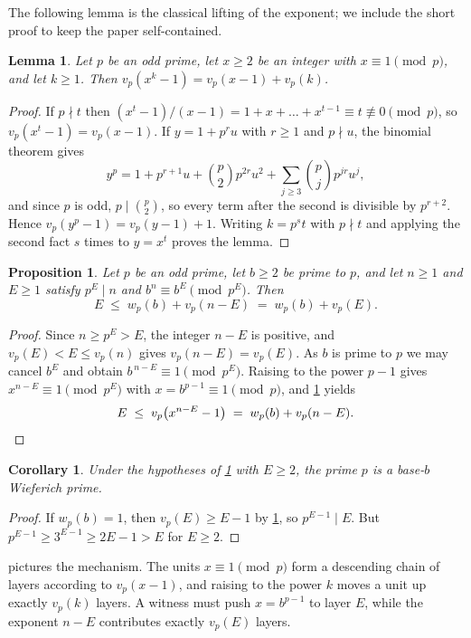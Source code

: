 \documentclass[11pt]{amsart}
\newtheorem{proposition}[theorem]{Proposition}
\newtheorem{lemma}[theorem]{Lemma}
\newtheorem{corollary}[theorem]{Corollary}
\theoremstyle{remark}
\newcommand{\vp}{v_p}
\begin{document}
The following lemma is the classical lifting of the exponent; we include the short proof to
keep the paper self-contained.

\begin{lemma}\label{lem:lte}
Let $p$ be an odd prime, let $x\ge 2$ be an integer with $x\equiv 1\pmod p$, and let $k\ge
1$. Then $\vp(x^{k}-1)=\vp(x-1)+\vp(k)$.
\end{lemma}

\begin{proof}
If $p\nmid t$ then $(x^{t}-1)/(x-1)=1+x+\dots+x^{t-1}\equiv t\not\equiv 0\pmod p$, so
$\vp(x^{t}-1)=\vp(x-1)$. If $y=1+p^{r}u$ with $r\ge 1$ and $p\nmid u$, the binomial theorem
gives
\[
y^{p}=1+p^{r+1}u+\binom p2 p^{2r}u^{2}+\sum_{j\ge 3}\binom pj p^{jr}u^{j},
\]
and since $p$ is odd, $p\mid\binom p2$, so every term after the second is divisible by
$p^{r+2}$. Hence $\vp(y^{p}-1)=\vp(y-1)+1$. Writing $k=p^{s}t$ with $p\nmid t$ and applying
the second fact $s$ times to $y=x^{t}$ proves the lemma.
\end{proof}

\begin{proposition}\label{prop:main}
Let $p$ be an odd prime, let $b\ge 2$ be prime to $p$, and let $n\ge 1$ and $E\ge 1$ satisfy
$p^{E}\mid n$ and $b^{n}\equiv b^{E}\pmod{p^{E}}$. Then
\[
E\;\le\; w_p(b)+\vp(n-E)\;=\;w_p(b)+\vp(E).
\]
\end{proposition}

\begin{proof}
Since $n\ge p^{E}>E$, the integer $n-E$ is positive, and $\vp(E)<E\le\vp(n)$ gives
$\vp(n-E)=\vp(E)$. As $b$ is prime to $p$ we may cancel $b^{E}$ and obtain
$b^{\,n-E}\equiv 1\pmod{p^{E}}$. Raising to the power $p-1$ gives $x^{n-E}\equiv
1\pmod{p^{E}}$ with $x=b^{p-1}\equiv 1\pmod p$, and \cref{lem:lte} yields
\[
E\;\le\;\vp\bigl(x^{n-E}-1\bigr)\;=\;w_p(b)+\vp(n-E).\qedhere
\]
\end{proof}

\begin{corollary}\label{cor:wieferich}
Under the hypotheses of \cref{prop:main} with $E\ge 2$, the prime $p$ is a base-$b$
Wieferich prime.
\end{corollary}

\begin{proof}
If $w_p(b)=1$, then $\vp(E)\ge E-1$ by \cref{prop:main}, so $p^{E-1}\mid E$. But
$p^{E-1}\ge 3^{E-1}\ge 2E-1>E$ for $E\ge 2$.
\end{proof}

 pictures the mechanism. The units $x\equiv 1\pmod p$ form a descending
chain of layers according to $\vp(x-1)$, and raising to the power $k$ moves a unit up
exactly $\vp(k)$ layers. A witness must push $x=b^{p-1}$ to layer $E$, while the exponent
$n-E$ contributes exactly $\vp(E)$ layers.
\end{document}
